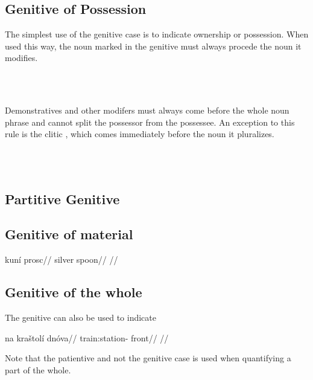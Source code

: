 \subsection{Genitive of Possession}

The simplest use of the genitive case is to indicate ownership or possession.
When used this way, the noun marked in the genitive must always procede the noun
it modifies.

\pex
{}\\
\\
\xe

Demonstratives and other modifers must always come before
the whole noun phrase and cannot split the possessor from the possessee. An
exception to this rule is the clitic , which comes immediately before
the noun it pluralizes.

\pex
\a  {}\\
\a  {}\\
\xe

\subsection{Partitive Genitive}

\subsection{Genitive of material}

\pex
\begingl
\gla kun\'i prosc//
\glb silver spoon//
\glft {}//
\endgl
\xe

\subsection{Genitive of the whole}
The genitive can also be used to indicate

\pex
\begingl
\gla na kra\v{s}tol\'i dn\'ova//
\glb {} train:station- front//
\glft {}//
\endgl
\xe

Note that the patientive and not the genitive case is used when quantifying a part of the whole.

